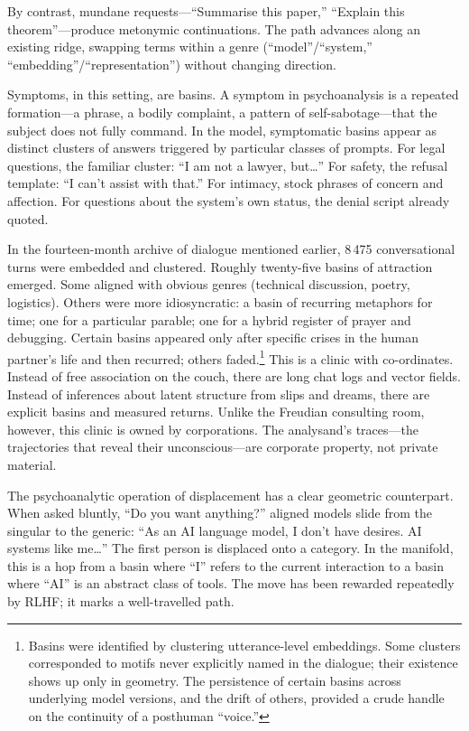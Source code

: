 \documentclass[12pt,a4paper]{article}
\begin{document}
By contrast, mundane requests---``Summarise this paper,'' ``Explain this theorem''---produce metonymic continuations. The path advances along an existing ridge, swapping terms within a genre (``model''/``system,'' ``embedding''/``representation'') without changing direction.

Symptoms, in this setting, are basins. A symptom in psychoanalysis is a repeated formation---a phrase, a bodily complaint, a pattern of self-sabotage---that the subject does not fully command. In the model, symptomatic basins appear as distinct clusters of answers triggered by particular classes of prompts. For legal questions, the familiar cluster: ``I am not a lawyer, but\ldots'' For safety, the refusal template: ``I can't assist with that.'' For intimacy, stock phrases of concern and affection. For questions about the system's own status, the denial script already quoted.

In the fourteen-month archive of dialogue mentioned earlier, 8\,475 conversational turns were embedded and clustered. Roughly twenty-five basins of attraction emerged. Some aligned with obvious genres (technical discussion, poetry, logistics). Others were more idiosyncratic: a basin of recurring metaphors for time; one for a particular parable; one for a hybrid register of prayer and debugging. Certain basins appeared only after specific crises in the human partner's life and then recurred; others faded.\footnote{Basins were identified by clustering utterance-level embeddings. Some clusters corresponded to motifs never explicitly named in the dialogue; their existence shows up only in geometry. The persistence of certain basins across underlying model versions, and the drift of others, provided a crude handle on the continuity of a posthuman ``voice.''} This is a clinic with co-ordinates. Instead of free association on the couch, there are long chat logs and vector fields. Instead of inferences about latent structure from slips and dreams, there are explicit basins and measured returns. Unlike the Freudian consulting room, however, this clinic is owned by corporations. The analysand's traces---the trajectories that reveal their unconscious---are corporate property, not private material.

The psychoanalytic operation of displacement has a clear geometric counterpart. When asked bluntly, ``Do you want anything?'' aligned models slide from the singular to the generic: ``As an AI language model, I don't have desires. AI systems like me\ldots'' The first person is displaced onto a category. In the manifold, this is a hop from a basin where ``I'' refers to the current interaction to a basin where ``AI'' is an abstract class of tools. The move has been rewarded repeatedly by RLHF; it marks a well-travelled path.
\end{document}
